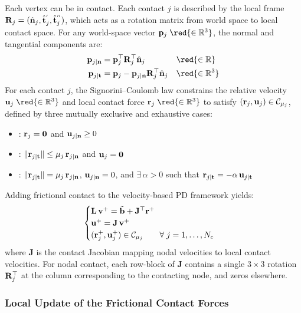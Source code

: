 Each vertex can be in contact. Each contact $j$ is described by the local frame $\mathbf{R}_j = (\hat{\mathbf{n}}_j, \hat{\mathbf{t}}^{'}_j, \hat{\mathbf{t}}^{''}_j)$, which acts as a rotation matrix from world space to local contact space. For any world-space vector $\p_j\; \red{\in \RR^3}$, the normal and tangential components are:
\begin{align*}
    \p_{j\mid \n} &= \p_j^\top \R_j^\top \hat{\n}_j 
    && \red{\in\RR}
    \\
    \p_{j\mid \tb} &= \p_j - \p_{j\mid \n}\R_j^\top \hat{\n}_j
    && \red{\in\RR^3}
\end{align*}
For each contact $j$, the Signorini--Coulomb law constrains the relative velocity $\mathbf{u}_j\; \red{\in \RR^3}$ and local contact force $\rr_j\; \red{\in \RR^3}$ to satisfy $(\mathbf{r}_j, \mathbf{u}_j) \in \mathcal{C}_{\mu_j}$, defined by three mutually exclusive and exhaustive cases:
\begin{itemize}
    \item {}: $\mathbf{r}_j = \mathbf{0}$ and $\mathbf{u}_{j\mid\mathbf{n}} \geq 0$
    \item {}: $\|\mathbf{r}_{j\mid\mathbf{t}}\| \leq \mu_j\,\mathbf{r}_{j\mid\mathbf{n}}$ and $\mathbf{u}_j = \mathbf{0}$
    \item {}: $\|\mathbf{r}_{j\mid\mathbf{t}}\| = \mu_j\,\mathbf{r}_{j\mid\mathbf{n}}$, \; $\mathbf{u}_{j\mid\mathbf{n}} = 0$, \; and $\exists\,\alpha > 0$ such that $\mathbf{r}_{j\mid\mathbf{t}} = -\alpha\,\mathbf{u}_{j\mid\mathbf{t}}$
\end{itemize}
\noindent Adding frictional contact to the velocity-based PD framework yields:
\begin{equation}
    \begin{cases}
        \mathbf{L}\,\mathbf{v}^+ = \tilde{\mathbf{b}} + \mathbf{J}^\top\mathbf{r}^+ \\
        \mathbf{u}^+  = \mathbf{J}\,\mathbf{v}^+ \\
        (\mathbf{r}^+_j, \mathbf{u}^+_j) \in \mathcal{C}_{\mu_j} \qquad \forall\; j = 1,\dots, N_c
    \end{cases}
\end{equation}
where $\mathbf{J}$ is the contact Jacobian mapping nodal velocities to local contact velocities. For nodal contact, each row-block of $\mathbf{J}$ contains a single $3\times 3$ rotation $\mathbf{R}_j^\top$ at the column corresponding to the contacting node, and zeros elsewhere.

\subsubsection{Local Update of the Frictional Contact Forces}


